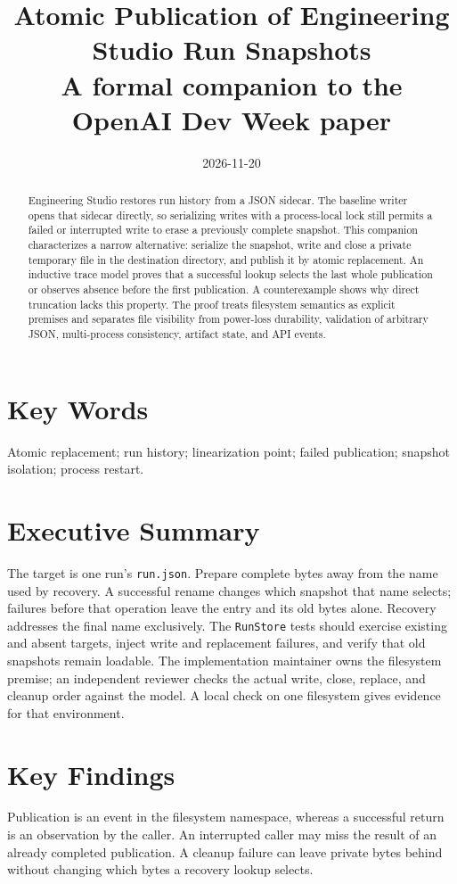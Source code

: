\documentclass[12pt]{article}
\title{Atomic Publication of Engineering Studio Run Snapshots\\
\large A formal companion to the OpenAI Dev Week paper}
\date{2026-11-20}
\begin{document}
\maketitle

\begin{abstract}
Engineering Studio restores run history from a JSON sidecar. The baseline
writer opens that sidecar directly, so serializing writes with a process-local
lock still permits a failed or interrupted write to erase a previously
complete snapshot. This companion characterizes a narrow alternative:
serialize the snapshot, write and close a private temporary file in the
destination directory, and publish it by atomic replacement. An inductive
trace model proves that a successful lookup selects the last whole
publication or observes absence before the first publication. A
counterexample shows why direct truncation lacks this property. The proof
treats filesystem semantics as explicit premises and separates file
visibility from power-loss durability, validation of arbitrary JSON,
multi-process consistency, artifact state, and API events.
\end{abstract}

\section*{Key Words}
Atomic replacement; run history; linearization point; failed publication;
snapshot isolation; process restart.

\section*{Executive Summary}
The target is one run's \texttt{run.json}. Prepare complete bytes away
from the name used by recovery. A successful rename changes which snapshot
that name selects; failures before that operation leave the entry and its
old bytes alone. Recovery addresses the final name exclusively. The
\texttt{RunStore} tests should exercise existing and absent targets, inject
write and replacement failures, and verify that old snapshots remain
loadable. The implementation maintainer owns the filesystem premise;
an independent reviewer checks the actual write, close, replace, and
cleanup order against the model. A local check on one filesystem gives
evidence for that environment.

\section*{Key Findings}
Publication is an event in the filesystem namespace, whereas a successful
return is an observation by the caller. An interrupted caller may miss the
result of an already completed publication. A cleanup failure can leave
private bytes behind without changing which bytes a recovery lookup selects.
\end{document}

